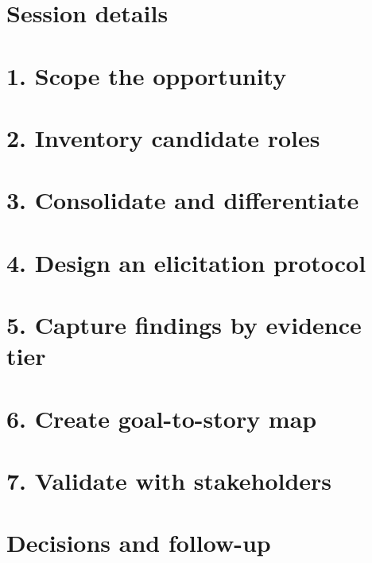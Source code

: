 \documentclass[11pt,letterpaper]{article}
\begin{document}
\section{Session details}
\section{1. Scope the opportunity}
\section{2. Inventory candidate roles}
\clearpage
\section{3. Consolidate and differentiate}
\section{4. Design an elicitation protocol}
\clearpage
\section{5. Capture findings by evidence tier}
\section{6. Create goal-to-story map}
\clearpage
\section{7. Validate with stakeholders}
\section{Decisions and follow-up}
\end{document}
